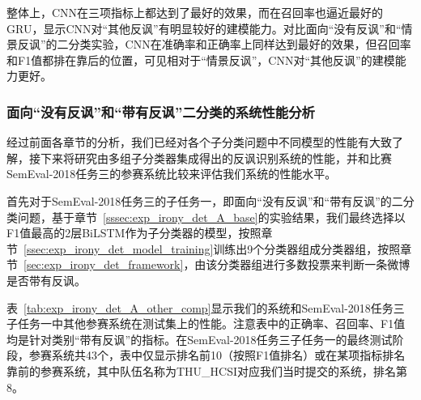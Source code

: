 整体上，CNN在三项指标上都达到了最好的效果，而在召回率也逼近最好的GRU，显示CNN对“其他反讽”有明显较好的建模能力。对比面向“没有反讽”和“情景反讽”的二分类实验，CNN在准确率和正确率上同样达到最好的效果，但召回率和F1值都排在靠后的位置，可见相对于“情景反讽”，CNN对“其他反讽”的建模能力更好。 

\subsubsection{面向“没有反讽”和“带有反讽”二分类的系统性能分析}

经过前面各章节的分析，我们已经对各个子分类问题中不同模型的性能有大致了解，接下来将研究由多组子分类器集成得出的反讽识别系统的性能，并和比赛SemEval-2018任务三的参赛系统比较来评估我们系统的性能水平。

首先对于SemEval-2018任务三的子任务一，即面向“没有反讽”和“带有反讽”的二分类问题，基于章节~\ref{sssec:exp_irony_det_A_base}的实验结果，我们最终选择以F1值最高的2层BiLSTM作为子分类器的模型，按照章节~\ref{ssec:exp_irony_det_model_training}训练出9个分类器组成分类器组，按照章节~\ref{sec:exp_irony_det_framework}，由该分类器组进行多数投票来判断一条微博是否带有反讽。

表~\ref{tab:exp_irony_det_A_other_comp}显示我们的系统和SemEval-2018任务三子任务一中其他参赛系统在测试集上的性能。注意表中的正确率、召回率、F1值均是针对类别“带有反讽”的指标。在SemEval-2018任务三子任务一的最终测试阶段，参赛系统共43个，表中仅显示排名前10（按照F1值排名）或在某项指标排名靠前的参赛系统，其中队伍名称为THU\_HCSI对应我们当时提交的系统，排名第8。


